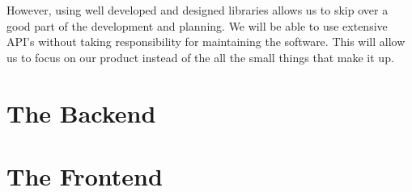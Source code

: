 However, using well developed and designed libraries allows us to skip over a good part of the development and planning. We will be able to use extensive API's without taking responsibility for maintaining the software. This will allow us to focus on our product instead of the all the small things that make it up. 

\section{The Backend}








\section{The Frontend}









